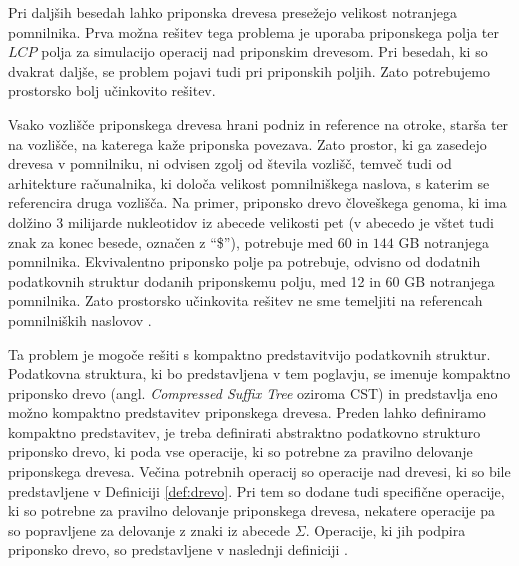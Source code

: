 Pri daljših besedah lahko priponska drevesa presežejo velikost notranjega pomnilnika. Prva možna rešitev tega problema je uporaba priponskega polja ter $LCP$ polja za simulacijo operacij nad priponskim drevesom. Pri besedah, ki so dvakrat daljše, se problem pojavi tudi pri priponskih poljih. Zato potrebujemo prostorsko bolj učinkovito rešitev. 

Vsako vozlišče priponskega drevesa hrani podniz in reference na otroke, starša ter na vozlišče, na katerega kaže priponska povezava. Zato prostor, ki ga zasedejo drevesa v pomnilniku, ni odvisen zgolj od števila vozlišč, temveč tudi od arhitekture računalnika, ki določa velikost pomnilniškega naslova, s katerim se referencira druga vozlišča. Na primer, priponsko drevo človeškega genoma, ki ima dolžino 3 milijarde nukleotidov iz abecede velikosti pet (v abecedo je vštet tudi znak za konec besede, označen z \enquote{\$}), potrebuje med $60$ in $144$ GB notranjega pomnilnika. Ekvivalentno priponsko polje pa potrebuje, odvisno od dodatnih podatkovnih struktur dodanih priponskemu polju, med 12 in 60 GB notranjega pomnilnika. Zato prostorsko učinkovita rešitev ne sme temeljiti na referencah pomnilniških naslovov \cite{GENOMEKNOWLEDGEHUB-2024-10-30}.

Ta problem je mogoče rešiti s kompaktno predstavitvijo podatkovnih struktur. Podatkovna struktura, ki bo predstavljena v tem poglavju, se imenuje kompaktno priponsko drevo (angl. \textit{Compressed Suffix Tree} oziroma CST) in predstavlja eno možno kompaktno predstavitev priponskega drevesa. Preden lahko definiramo kompaktno predstavitev, je treba definirati abstraktno podatkovno strukturo priponsko drevo, ki poda vse operacije, ki so potrebne za pravilno delovanje priponskega drevesa. Večina potrebnih operacij so operacije nad drevesi, ki so bile predstavljene v Definiciji \ref{def:drevo}. Pri tem so dodane tudi specifične operacije, ki so potrebne za pravilno delovanje priponskega drevesa, nekatere operacije pa so popravljene za delovanje z znaki iz abecede $\Sigma$. Operacije, ki jih podpira priponsko drevo, so predstavljene v naslednji definiciji \cite{Sadakane2007}.


